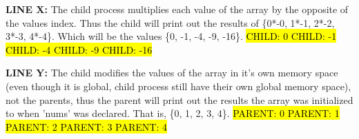 \documentclass[12pt]{jhwhw}
\begin{document}
	\begin{addmargin}[1em]{}
		\textbf{LINE X:} The child process multiplies each value of the array by the opposite
		of the values index. Thus the child will print out the results of
		\{0*-0, 1*-1, 2*-2, 3*-3, 4*-4\}. Which will be the values
		\{0, -1, -4, -9, -16\}.
		\bigbreak
		\hl{CHILD: 0 CHILD: -1 CHILD: -4 CHILD: -9 CHILD: -16}

		\textbf{LINE Y:} The child modifies the values of the array in it's own memory space
		(even though it is global, child process still have their own global memory space),
		not the parents, thus the parent will print out the results the array was
		initialized to when 'nums' was declared. That is, \{0, 1, 2, 3, 4\}.
		\bigbreak
		\hl{PARENT: 0 PARENT: 1 PARENT: 2 PARENT: 3 PARENT: 4}
	\end{addmargin}
\end{document}
